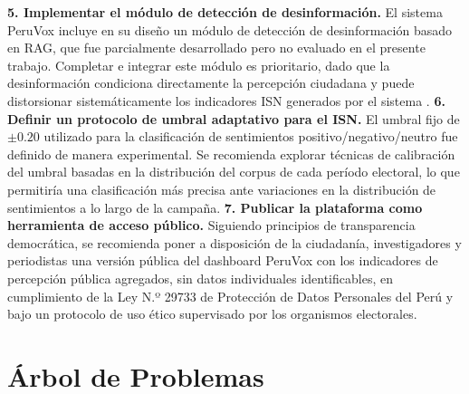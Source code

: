\documentclass[listof=nochaptergap,12pt,times,authoryear]{report}
\begin{document}
\textbf{5. Implementar el módulo de detección de desinformación.} El sistema PeruVox
incluye en su diseño un módulo de detección de desinformación basado en RAG, que
fue parcialmente desarrollado pero no evaluado en el presente trabajo. Completar
e integrar este módulo es prioritario, dado que la desinformación condiciona
directamente la percepción ciudadana y puede distorsionar sistemáticamente los
indicadores ISN generados por el sistema \parencite{pr_chen2024combating_misinformation}.
\textbf{6. Definir un protocolo de umbral adaptativo para el ISN.} El umbral fijo de $\pm 0.20$ utilizado para la clasificación de sentimientos positivo/negativo/neutro
fue definido de manera experimental. Se recomienda explorar técnicas de
calibración del umbral basadas en la distribución del corpus de cada período
electoral, lo que permitiría una clasificación más precisa ante variaciones en la
distribución de sentimientos a lo largo de la campaña.
\textbf{7. Publicar la plataforma como herramienta de acceso público.} Siguiendo
principios de transparencia democrática, se recomienda poner a disposición de la
ciudadanía, investigadores y periodistas una versión pública del dashboard PeruVox
con los indicadores de percepción pública agregados, sin datos individuales
identificables, en cumplimiento de la Ley N.º 29733 de Protección de Datos
Personales del Perú y bajo un protocolo de uso ético supervisado por los
organismos electorales.

\printbibliography[heading=bibintoc,title={Referencias}]

\appendix
\renewcommand{\appendixname}{Anexo} %
\renewcommand{\appendixtocname}{Anexos} %
\renewcommand{\appendixpagename}{Anexos}
\clearpage
\addappheadtotoc
\appendixpage

\appendix
\setcounter{section}{0}%
\renewcommand{\thesection}{\Alph{section}}%

\section{Árbol de Problemas}
\end{document}
